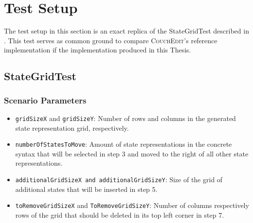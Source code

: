 \chapter{Test Setup}
\label{app:testsetup}
The test setup in this section is an exact replica of the StateGridTest described in \cite{nachreiner_couchedit_2020}. This test serves as common ground to compare \textsc{CouchEdit}'s reference implementation if the implementation produced in this Thesis.

\section{StateGridTest}
\subsection{Scenario Parameters}

\begin{itemize}
  \item \texttt{gridSizeX} and \texttt{gridSizeY}: Number of rows and columns in the generated state representation grid, respectively.
  \item \texttt{numberOfStatesToMove}: Amount of state representations in the concrete syntax that will be selected in step 3 and moved to the right of all other state representations.
  \item \texttt{additionalGridSizeX and additionalGridSizeY}: Size of the grid of additional states that will be inserted in step 5.
  \item \texttt{toRemoveGridSizeX} and \texttt{ToRemoveGridSizeY}: Number of columns respectively rows of the grid that should be deleted in its top left corner in step 7.
\end{itemize}

